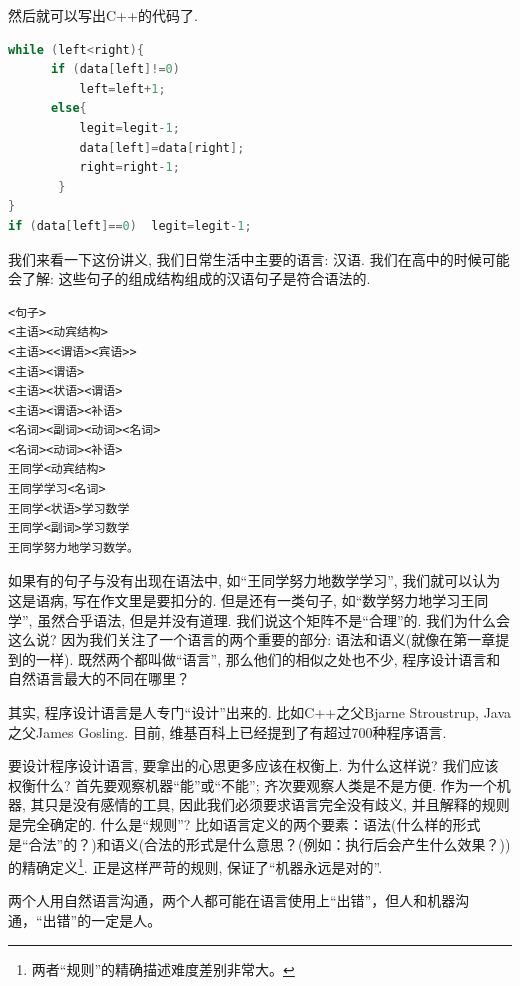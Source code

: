 然后就可以写出C++的代码了. 

\begin{lstlisting}[language=c++]
while (left<right){
      if (data[left]!=0)
          left=left+1;
      else{
          legit=legit-1;
          data[left]=data[right];
          right=right-1;
       }
}
if (data[left]==0)  legit=legit-1;
	\end{lstlisting}



我们来看一下这份讲义, 我们日常生活中主要的语言: 汉语. 我们在高中的时候可能会了解: 这些句子的组成结构组成的汉语句子是符合语法的.  

\begin{lstlisting}
<句子>
<主语><动宾结构>
<主语><<谓语><宾语>>
<主语><谓语>
<主语><状语><谓语>
<主语><谓语><补语>
<名词><副词><动词><名词>
<名词><动词><补语>
王同学<动宾结构>
王同学学习<名词>
王同学<状语>学习数学
王同学<副词>学习数学
王同学努力地学习数学。
\end{lstlisting}

如果有的句子与没有出现在语法中, 如“王同学努力地数学学习”, 我们就可以认为这是语病, 写在作文里是要扣分的. 但是还有一类句子, 如“数学努力地学习王同学”, 虽然合乎语法, 但是并没有道理. 我们说这个矩阵不是“合理”的. 我们为什么会这么说? 因为我们关注了一个语言的两个重要的部分: 语法和语义(就像在第一章提到的一样). 既然两个都叫做``语言'', 那么他们的相似之处也不少, 程序设计语言和自然语言最大的不同在哪里？


其实, 程序设计语言是人专门``设计''出来的. 比如C++之父Bjarne Stroustrup, Java之父James Gosling. 目前, 维基百科上已经提到了有超过700种程序语言. 


要设计程序设计语言, 要拿出的心思更多应该在权衡上. 为什么这样说? 我们应该权衡什么? 首先要观察机器``能''或``不能''; 齐次要观察人类是不是方便. 作为一个机器, 其只是没有感情的工具, 因此我们必须要求语言完全没有歧义, 并且解释的规则是完全确定的. 什么是``规则''? 比如语言定义的两个要素：语法(什么样的形式是“合法”的？)和语义(合法的形式是什么意思？(例如：执行后会产生什么效果？))的精确定义\footnote{两者“规则”的精确描述难度差别非常大。}. 正是这样严苛的规则, 保证了``机器永远是对的''.

两个人用自然语言沟通，两个人都可能在语言使用上“出错”，但人和机器沟通，“出错”的一定是人。


 






